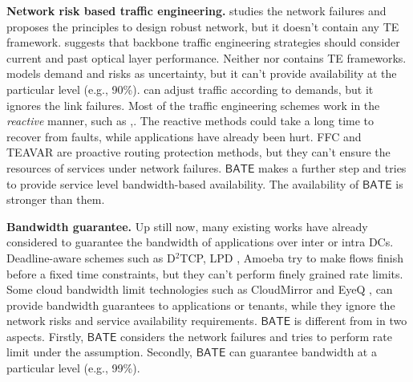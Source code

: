 \documentclass[sigconf]{acmart}
\begin{document}
\textbf{Network risk based traffic engineering.}
\cite{evole} studies the network failures and proposes the principles to design robust network, but it doesn't contain any TE framework.
\cite{Optical} suggests that backbone traffic engineering strategies should consider current and past optical layer performance.
Neither \cite{evole} nor \cite{Optical} contains TE frameworks.
 \cite{Stochastic} models demand and risks as uncertainty, but it can't provide availability at the particular level (e.g., 90\%).
 \cite{bi2019uncertainty-aware} can adjust traffic according to demands, but it ignores the link failures.
 Most of the traffic engineering schemes work in the \textit{reactive} manner, such as \cite{jointfailure},\cite{R3}.
The reactive methods could take a long time to recover from faults, while applications have already been hurt\cite{FFC}.
FFC \cite{FFC} and TEAVAR\cite{Teavar} are proactive routing protection methods, but they can't ensure the resources of services under network failures.
$\mathsf{BATE}$ makes a further step and tries to provide service level bandwidth-based availability.
The availability of $\mathsf{BATE}$ is stronger than them.



\textbf{Bandwidth guarantee.}
Up still now, many existing works have already considered to guarantee the bandwidth of applications over inter or intra DCs.
Deadline-aware schemes such as D$^2$TCP\cite{D2TCP}, LPD \cite{LPD}, Amoeba\cite{Guaranteeings}  try to make flows finish before a fixed time constraints,
but they can't perform finely grained rate limits.
Some cloud bandwidth limit technologies such as CloudMirror \cite{appdriven} and EyeQ \cite{EyeQ}, can provide bandwidth guarantees to applications or tenants, while they ignore the network risks and service availability requirements.
$\mathsf{BATE}$ is different from in two aspects.
Firstly, $\mathsf{BATE}$ considers the network failures and tries to perform rate limit under the assumption.
Secondly, $\mathsf{BATE}$ can guarantee bandwidth at a particular level (e.g., 99\%). 
\end{document}
